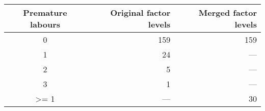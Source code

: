 \begin{longtable}{crr}
\toprule
Premature labours & Original factor levels & Merged factor levels \\ 
\midrule
0 & 159 & 159 \\ 
1 & 24 & — \\ 
2 & 5 & — \\ 
3 & 1 & — \\ 
>= 1 & — & 30 \\ 
\bottomrule
\end{longtable}

